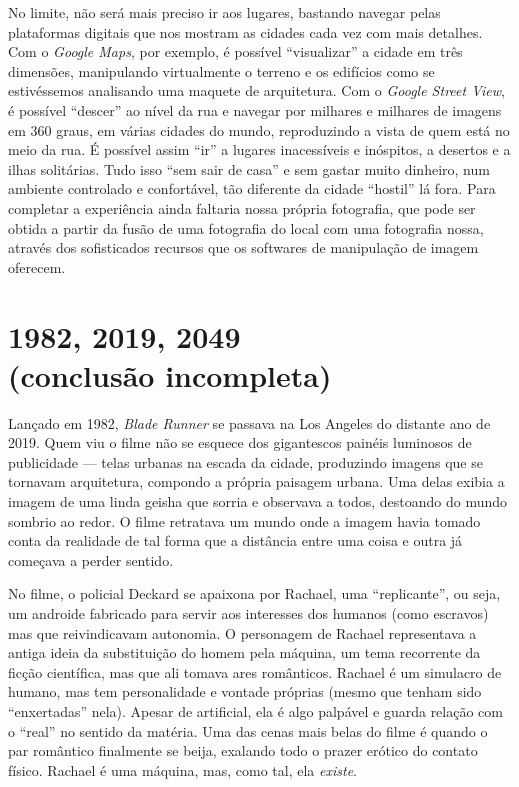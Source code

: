 No limite, não será mais preciso ir aos lugares, bastando navegar pelas
plataformas digitais que nos mostram as cidades cada vez com mais
detalhes. Com o \emph{Google Maps}, por exemplo, é possível
``visualizar'' a cidade em três dimensões, manipulando virtualmente o
terreno e os edifícios como se estivéssemos analisando uma maquete de
arquitetura. Com o \emph{Google Street View}, é possível ``descer'' ao
nível da rua e navegar por milhares e milhares de imagens em 360 graus,
em várias cidades do mundo, reproduzindo a vista de quem está no meio da
rua. É possível assim ``ir'' a lugares inacessíveis e inóspitos, a
desertos e a ilhas solitárias. Tudo isso ``sem sair de casa'' e sem
gastar muito dinheiro, num ambiente controlado e confortável, tão
diferente da cidade ``hostil'' lá fora. Para completar a experiência
ainda faltaria nossa própria fotografia, que pode ser obtida a partir da
fusão de uma fotografia do local com uma fotografia nossa, através dos
sofisticados recursos que os softwares de manipulação de imagem
oferecem.

\chapter*{1982, 2019, 2049\\ (conclusão incompleta)}

Lançado em 1982, \emph{Blade Runner} se passava na Los Angeles do
distante ano de 2019. Quem viu o filme não se esquece dos gigantescos
painéis luminosos de publicidade --- telas urbanas na escada da cidade,
produzindo imagens que se tornavam arquitetura, compondo a própria
paisagem urbana. Uma delas exibia a imagem de uma linda geisha que
sorria e observava a todos, destoando do mundo sombrio ao redor. O filme
retratava um mundo onde a imagem havia tomado conta da realidade de tal
forma que a distância entre uma coisa e outra já começava a perder
sentido.

No filme, o policial Deckard se apaixona por Rachael, uma
``replicante'', ou seja, um androide fabricado para servir aos
interesses dos humanos (como escravos) mas que reivindicavam autonomia.
O personagem de Rachael representava a antiga ideia da substituição do
homem pela máquina, um tema recorrente da ficção científica, mas que ali
tomava ares românticos. Rachael é um simulacro de humano, mas tem
personalidade e vontade próprias (mesmo que tenham sido ``enxertadas''
nela). Apesar de artificial, ela é algo palpável e guarda relação com o
``real'' no sentido da matéria. Uma das cenas mais belas do filme é
quando o par romântico finalmente se beija, exalando todo o prazer
erótico do contato físico. Rachael é uma máquina, mas, como tal, ela
\emph{existe}.

